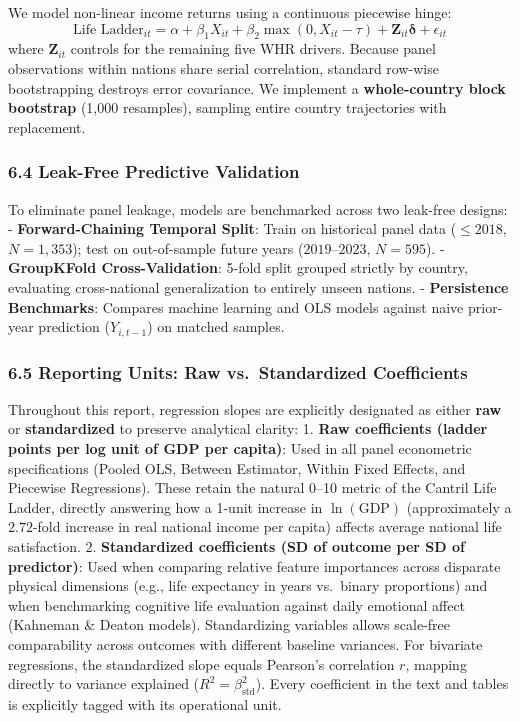 \documentclass[
]{article}
\begin{document}
We model non-linear income returns using a continuous piecewise hinge:
\[\text{Life Ladder}_{it} = \alpha + \beta_1 X_{it} + \beta_2 \max(0, X_{it} - \tau) + \mathbf{Z}_{it}\boldsymbol{\delta} + \epsilon_{it}\]
where \(\mathbf{Z}_{it}\) controls for the remaining five WHR drivers.
Because panel observations within nations share serial correlation,
standard row-wise bootstrapping destroys error covariance. We implement
a \textbf{whole-country block bootstrap} (1,000 resamples), sampling
entire country trajectories with replacement.

\hypertarget{leak-free-predictive-validation}{%
\subsubsection{6.4 Leak-Free Predictive
Validation}\label{leak-free-predictive-validation}}

To eliminate panel leakage, models are benchmarked across two leak-free
designs: - \textbf{Forward-Chaining Temporal Split}: Train on historical
panel data (\(\le 2018\), \(N=1,353\)); test on out-of-sample future
years (\(2019–2023\), \(N=595\)). - \textbf{GroupKFold
Cross-Validation}: 5-fold split grouped strictly by country, evaluating
cross-national generalization to entirely unseen nations. -
\textbf{Persistence Benchmarks}: Compares machine learning and OLS
models against naive prior-year prediction (\(Y_{i, t-1}\)) on matched
samples.

\hypertarget{reporting-units-raw-vs.-standardized-coefficients}{%
\subsubsection{6.5 Reporting Units: Raw vs.~Standardized
Coefficients}\label{reporting-units-raw-vs.-standardized-coefficients}}

Throughout this report, regression slopes are explicitly designated as
either \textbf{raw} or \textbf{standardized} to preserve analytical
clarity: 1. \textbf{Raw coefficients (ladder points per log unit of GDP
per capita)}: Used in all panel econometric specifications (Pooled OLS,
Between Estimator, Within Fixed Effects, and Piecewise Regressions).
These retain the natural 0--10 metric of the Cantril Life Ladder,
directly answering how a 1-unit increase in \(\ln(\text{GDP})\)
(approximately a \(2.72\)-fold increase in real national income per
capita) affects average national life satisfaction. 2.
\textbf{Standardized coefficients (SD of outcome per SD of predictor)}:
Used when comparing relative feature importances across disparate
physical dimensions (e.g., life expectancy in years vs.~binary
proportions) and when benchmarking cognitive life evaluation against
daily emotional affect (Kahneman \& Deaton models). Standardizing
variables allows scale-free comparability across outcomes with different
baseline variances. For bivariate regressions, the standardized slope
equals Pearson's correlation \(r\), mapping directly to variance
explained (\(R^2 = \beta_{\text{std}}^2\)). Every coefficient in the
text and tables is explicitly tagged with its operational unit.
\end{document}
